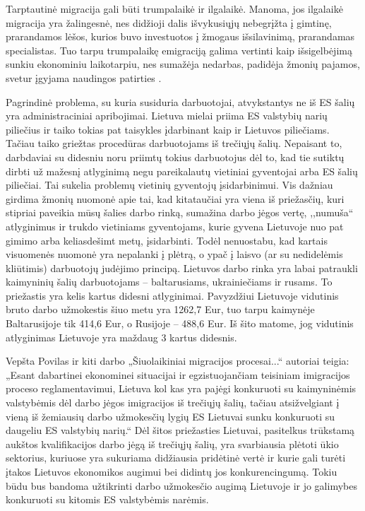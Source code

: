 \documentclass[11pt, titlepage]{article}
\begin{document}
	
	
	Tarptautinė migracija gali būti trumpalaikė ir ilgalaikė. Manoma, jos ilgalaikė migracija yra žalingesnė, nes didžioji dalis išvykusiųjų nebegrįžta į gimtinę, prarandamos lėšos, kurios buvo investuotos į žmogaus išsilavinimą, prarandamas specialistas. Tuo tarpu trumpalaikę emigraciją galima vertinti kaip išsigelbėjimą sunkiu ekonominiu laikotarpiu, nes sumažėja nedarbas, padidėja žmonių pajamos, svetur įgyjama naudingos patirties \parencite{damuliene2013migracijos}.
	
	Pagrindinė problema, su kuria susiduria darbuotojai, atvykstantys ne iš ES šalių yra administraciniai apribojimai. Lietuva mielai priima ES valstybių narių piliečius ir taiko tokias pat taisykles įdarbinant kaip ir Lietuvos piliečiams. Tačiau taiko griežtas procedūras darbuotojams iš trečiųjų šalių. Nepaisant to, darbdaviai su didesniu noru priimtų tokius darbuotojus dėl to, kad tie sutiktų dirbti už mažesnį atlyginimą negu pareikalautų vietiniai gyventojai arba ES šalių piliečiai. Tai sukelia problemų vietinių gyventojų įsidarbinimui. Vis dažniau girdima žmonių nuomonė apie tai, kad kitataučiai yra viena iš priežasčių, kuri stipriai paveikia mūsų šalies darbo rinką, sumažina darbo jėgos vertę,  ,,numuša“ atlyginimus ir trukdo vietiniams gyventojams, kurie gyvena Lietuvoje nuo pat gimimo arba keliasdešimt metų, įsidarbinti. Todėl nenuostabu, kad kartais visuomenės nuomonė yra nepalanki į plėtrą, o ypač į laisvo (ar su nedidelėmis kliūtimis) darbuotojų judėjimo principą. Lietuvos darbo rinka yra labai patraukli kaimyninių šalių darbuotojams – baltarusiams, ukrainiečiams ir rusams. To priežastis yra kelis kartus didesni atlyginimai. Pavyzdžiui Lietuvoje vidutinis bruto darbo užmokestis šiuo metu yra 1262,7 Eur, tuo tarpu kaimynėje Baltarusijoje tik 414,6 Eur, o Rusijoje – 488,6 Eur. Iš šito matome, jog vidutinis atlyginimas Lietuvoje yra maždaug 3 kartus didesnis.
	

	Vepšta Povilas ir kiti darbo „Šiuolaikiniai migracijos procesai...“ autoriai teigia: „Esant dabartinei ekonominei situacijai ir egzistuojančiam teisiniam imigracijos proceso reglamentavimui, Lietuva kol kas yra pajėgi konkuruoti su kaimyninėmis valstybėmis dėl darbo jėgos imigracijos iš trečiųjų šalių, tačiau atsižvelgiant į vieną iš žemiausių darbo užmokesčių lygių ES Lietuvai sunku konkuruoti su daugeliu ES valstybių narių.“ Dėl šitos priežasties Lietuvai, pasitelkus trūkstamą aukštos kvalifikacijos darbo jėgą iš trečiųjų šalių, yra svarbiausia plėtoti ūkio sektorius, kuriuose yra sukuriama didžiausia pridėtinė vertė ir kurie gali turėti įtakos Lietuvos ekonomikos augimui  bei didintų jos konkurencingumą. Tokiu būdu bus bandoma užtikrinti darbo užmokesčio augimą Lietuvoje ir jo galimybes konkuruoti su kitomis ES valstybėmis narėmis. 
\end{document}
